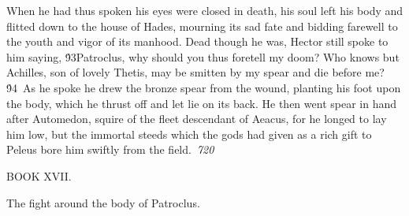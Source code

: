 {When he had thus spoken his eyes were closed in death, his soul left his body and flitted down to the house of Hades, mourning its sad fate and bidding farewell to the youth and vigor of its manhood. Dead though he was, Hector still spoke to him saying, \'93Patroclus, why should you thus foretell my doom? Who knows but Achilles, son of lovely Thetis, may be smitten by my spear and die before me?\'94\
As he spoke he drew the bronze spear from the wound, planting his foot upon the body, which he thrust off and let lie on its back. He then went spear in hand after Automedon, squire of the fleet descendant of Aeacus, for he longed to lay him low, but the immortal steeds which the gods had given as a rich gift to Peleus bore him swiftly from the field.\
\pard{}\sl720\qc{}

  BOOK XVII.\
\pard\pardeftab720\qj{}

\fs25\fsmilli12800 \cf2 The fight around the body of Patroclus.\
\pard{}\qj{}

}
